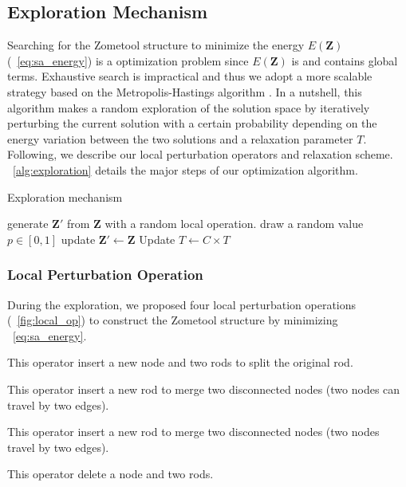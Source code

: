 \subsection{Exploration Mechanism}
Searching for the Zometool structure to minimize the energy $E(\mathbf{Z})$ (\eqname~\ref{eq:sa_energy}) is a  optimization problem since $E(\mathbf{Z})$ is  and contains global terms. 
Exhaustive search is impractical and thus we adopt a more scalable strategy based on the Metropolis-Hastings algorithm \cite{hastings:1970:monte}.
In a nutshell, this algorithm makes a random exploration of the solution space by iteratively perturbing the current solution with a certain probability depending on the energy variation between the two solutions and a relaxation parameter $T$.
Following, we describe our local perturbation operators and relaxation scheme.
\algoname~\ref{alg:exploration} details the major steps of our optimization algorithm.

\begin{algorithm}[!ht]
\caption{Exploration mechanism}
\label{alg:exploration}
\begin{algorithmic}[1]
\Repeat
    \State generate $\mathbf{Z}'$ from $\mathbf{Z}$ with a random local operation.
    \State draw a random value $p \in [0, 1]$ 
        \State update $\mathbf{Z}' \leftarrow \mathbf{Z}$
    \EndIf
    \State Update $T \leftarrow C\times T$ 
\EndProcedure
\end{algorithmic}
\end{algorithm}

\subsubsection{Local Perturbation Operation}
During the exploration, we proposed four local perturbation operations (\figname~\ref{fig:local_op}) to construct the Zometool structure by minimizing \eqname~\ref{eq:sa_energy}.
\begin{description}[nosep,itemsep=0pt,leftmargin=0pt]
\item[Split] This operator insert a new node and  two rods to split the original rod.
\item[Merge] This operator insert a new rod to merge two disconnected nodes (two nodes can travel by two edges). 
\item[Bridge] This operator insert a new rod to merge two disconnected nodes (two nodes  travel by two edges).
\item[Kill] This operator delete a node and two rods.
\end{description}


